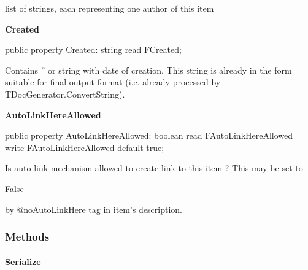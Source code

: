 \documentclass{report}
\newif\ifpdf
\begin{document}
\begin{list}{}
\begin{flushleft}
\ifpdf
\end{flushleft}
\fi


\par list of strings, each representing one author of this item\label{PasDoc_Items.TBaseItem-Created}
\item[\textbf{Created}\hfill]
\ifpdf
\begin{flushleft}
\fi
\begin{ttfamily}
public property Created: string read FCreated;\end{ttfamily}

\ifpdf
\end{flushleft}
\fi


\par Contains '' or string with date of creation. This string is already in the form suitable for final output format (i.e. already processed by TDocGenerator.ConvertString).\label{PasDoc_Items.TBaseItem-AutoLinkHereAllowed}
\item[\textbf{AutoLinkHereAllowed}\hfill]
\ifpdf
\begin{flushleft}
\fi
\begin{ttfamily}
public property AutoLinkHereAllowed: boolean
      read FAutoLinkHereAllowed write FAutoLinkHereAllowed default true;\end{ttfamily}

\ifpdf
\end{flushleft}
\fi


\par Is auto{-}link mechanism allowed to create link to this item ? This may be set to \begin{ttfamily}False\end{ttfamily} by @noAutoLinkHere tag in item's description.\end{list}
\subsubsection*{\large{\textbf{Methods}}\normalsize\hspace{1ex}\hfill}
\paragraph*{Serialize}\hspace*{\fill}
\end{document}
